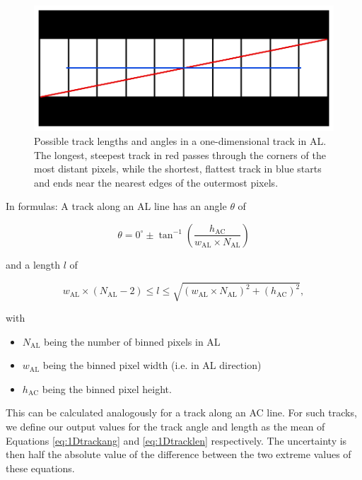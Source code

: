 \documentclass[a4paper, 11pt]{article}
\begin{document}
\begin{figure}
  \centering
  \includegraphics{images/postprocessing/1D_angle}
  \caption{Possible track lengths and angles in a one-dimensional track in AL. The longest, steepest track in red passes through the corners of the most distant pixels, while the shortest, flattest track in blue starts and ends near the nearest edges of the outermost pixels.}
  \label{fig:1D_angle}
\end{figure}

In formulas: A track along an AL line has an angle $\theta$ of

\begin{equation}
  \theta = 0^{\circ} \pm \tan^{-1} \left( \frac{{h_\mathrm{AC}}}{w_\mathrm{AL} \times N_\mathrm{AL}} \right)
  \label{eq:1Dtrackang}
\end{equation}

and a length $l$ of

\begin{equation}
  w_\mathrm{AL} \times \left(N_\mathrm{AL}-2\right) \leq l \leq \sqrt{\left( w_\mathrm{AL} \times N_\mathrm{AL} \right)^{2} + \left( h_\mathrm{AC}\right)^{2}},
  \label{eq:1Dtracklen}
\end{equation}

with
\begin{itemize}
  \item $N_\mathrm{AL}$ being the number of binned pixels in AL
  \item $w_\mathrm{AL}$ being the binned pixel width (i.e. in AL direction)
  \item $h_\mathrm{AC}$ being the binned pixel height.
\end{itemize}

This can be calculated analogously for a track along an AC line. For such tracks, we define our output values for the track angle and length as the mean of Equations \ref{eq:1Dtrackang} and \ref{eq:1Dtracklen} respectively. The uncertainty is then half the absolute value of the difference between the two extreme values of these equations.
\end{document}
